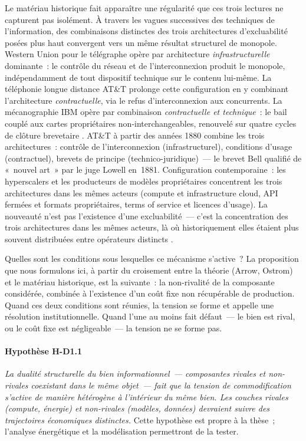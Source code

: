 Le matériau historique fait apparaître une régularité que ces trois lectures ne capturent pas isolément. À travers les vagues successives des techniques de l'information, des combinaisons distinctes des trois architectures d'excluabilité posées plus haut convergent vers un même résultat structurel de monopole. Western Union pour le télégraphe opère par architecture \emph{infrastructurelle} dominante~: le contrôle du réseau et de l'interconnexion produit le monopole, indépendamment de tout dispositif technique sur le contenu lui-même. La téléphonie longue distance AT\&T prolonge cette configuration en y combinant l'architecture \emph{contractuelle}, via le refus d'interconnexion aux concurrents. La mécanographie IBM opère par combinaison \emph{contractuelle et technique}~: le bail couplé aux cartes propriétaires non-interchangeables, renouvelé sur quatre cycles de clôture brevetaire \parencite{mounier_kuhn_2010,heide_punched_2009}. AT\&T à partir des années 1880 \parencite{beauchamp_invented_2010} combine les trois architectures~: contrôle de l'interconnexion (infrastructurel), conditions d'usage (contractuel), brevets de principe (technico-juridique)~--- le brevet Bell qualifié de «~nouvel art~» par le juge Lowell en~1881. Configuration contemporaine~: les hyperscalers et les producteurs de modèles propriétaires concentrent les trois architectures dans les mêmes acteurs (compute et infrastructure cloud, API fermées et formats propriétaires, terms of service et licences d'usage). La nouveauté n'est pas l'existence d'une excluabilité~--- c'est la concentration des trois architectures dans les mêmes acteurs, là où historiquement elles étaient plus souvent distribuées entre opérateurs distincts \parencite{autor_fall_2020}.

Quelles sont les conditions sous lesquelles ce mécanisme s'active~? La proposition que nous formulons ici, à partir du croisement entre la théorie (Arrow, Ostrom) et le matériau historique, est la suivante~: la non-rivalité de la composante considérée, combinée à l'existence d'un coût fixe non récupérable de production. Quand ces deux conditions sont réunies, la tension se forme et appelle une résolution institutionnelle. Quand l'une au moins fait défaut~--- le bien est rival, ou le coût fixe est négligeable~--- la tension ne se forme pas.

\paragraph{Hypothèse H-D1.1} \emph{La dualité structurelle du bien informationnel~--- composantes rivales et non-rivales coexistant dans le même objet~--- fait que la tension de commodification s'active de manière hétérogène à l'intérieur du même bien. Les couches rivales (compute, énergie) et non-rivales (modèles, données) devraient suivre des trajectoires économiques distinctes.} Cette hypothèse est propre à la thèse~; l'analyse énergétique et la modélisation permettront de la tester.


